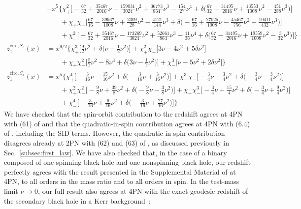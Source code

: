 \documentclass[prd,superscriptaddress,preprintnumbers,tightenlines,nofootinbib, eqsecnum]{revtex4-2}
\newcommand{\nn}{\nonumber}
\begin{document}
\begin{subequations}
\begin{align}
& + x^{5}\Bigg\{\chi_{+}^2\Bigg[-\frac{67}{32} + \frac{35467}{2016} \nu - \frac{159031}{3024} \nu^{2} + \frac{36773}{864} \nu^{3} - \frac{154}{27} \nu^{4} + \delta\Bigg(\frac{67}{32} - \frac{31495}{2016} \nu + \frac{13553}{1008} \nu^{2} - \frac{451}{288} \nu^{3}\Bigg)\Bigg] \nn \\
&\qquad  + \chi_{+}\chi_{-}\Bigg[\frac{67}{16} - \frac{39937}{1008} \nu + \frac{2309}{28} \nu^{2} - \frac{4121}{144} \nu^{3} + \delta\Bigg(-\frac{67}{16} + \frac{27025}{1008} \nu - \frac{45467}{756} \nu^{2} + \frac{10411}{432} \nu^{3}\Bigg)\Bigg] \nn \\
&\qquad + \chi_{-}^2\Bigg[-\frac{67}{32} + \frac{35467}{2016} \nu - \frac{173269}{3024} \nu^{2} + \frac{52661}{864} \nu^{3} - \frac{11}{36} \nu^{4} + \delta\Bigg(\frac{67}{32} - \frac{31495}{2016} \nu + \frac{19559}{1008} \nu^{2} - \frac{3}{32} \nu^{3}\Bigg)\Bigg]\Bigg\} \\
z_1^{\text{circ},S_3}(x) &= x^{9/2}\Bigg\{\chi_{+}^3\Bigg[\frac{9}{2} \nu^{2} + \delta\Bigg(\nu - \frac{1}{2} \nu^{2}\Bigg)\Bigg] + \chi_{+}^2\chi_{-}\Bigg[3 \nu - 4 \nu^{2} + 5 \delta \nu^{2}\Bigg] \nn \\
&\qquad + \chi_{+}\chi_{-}^2\Bigg[\frac{5}{2} \nu^{2} - 8 \nu^{3} + \delta\Bigg(3 \nu - \frac{1}{2} \nu^{2}\Bigg)\Bigg] + \chi_{-}^3\Bigg[\nu - 5 \nu^{2} + 2 \delta \nu^{2}\Bigg]\Bigg\} \\
z_1^{\text{circ},S_4}(x) &= x^{5}\Bigg\{\chi_{+}^4\Bigg[-\frac{3}{16} \nu - \frac{15}{16} \nu^{2} + \delta\Bigg(-\frac{3}{16} \nu + \frac{3}{16} \nu^{2}\Bigg)\Bigg] + \chi_{+}^3\chi_{-}\Bigg[-\frac{3}{4} \nu + \frac{3}{4} \nu^{2} + \delta\Bigg(-\frac{3}{4} \nu - \frac{3}{4} \nu^{2}\Bigg)\Bigg] \nn \\
&\qquad + \chi_{+}^2\chi_{-}^2\Bigg[-\frac{9}{8} \nu + \frac{39}{8} \nu^{2} + \delta\Bigg(-\frac{9}{8} \nu - \frac{3}{8} \nu^{2}\Bigg)\Bigg] + \chi_{+}\chi_{-}^3\Bigg[-\frac{3}{4} \nu + \frac{15}{4} \nu^{2} + \delta\Bigg(-\frac{3}{4} \nu + \frac{9}{4} \nu^{2}\Bigg)\Bigg] \nn \\
& \qquad  + \chi_{-}^4\Bigg[-\frac{3}{16} \nu + \frac{9}{16} \nu^{2} + \delta\Bigg(-\frac{3}{16} \nu + \frac{27}{16} \nu^{2}\Bigg)\Bigg]\Bigg\}
\end{align}
\end{subequations}
%
%
We have checked that 
the spin-orbit contribution to the redshift agrees at 4PN with  (61) of \cite{Bini:2019lcd} and that the quadratic-in-spin contribution agrees at 4PN  with (6.4) of \cite{Bini:2020zqy}, including the SID terms. However, the quadratic-in-spin contribution disagrees already at 2PN with (62) and (63) of \cite{Bini:2019lcd}, as discussed previously in Sec.~\ref{subsec:first_law}. We have also checked that, in the case of a binary composed of one spinning black hole and one nonspinning black hole, our redshift perfectly agrees with the result presented in the Supplemental Material of \cite{Bautista:2024agp} at 4PN, to all orders in the mass ratio and to all orders in spin. In the test-mass limit $\nu\rightarrow 0$, our full result also agrees at 4PN with the exact geodesic redshift of the secondary black hole in a Kerr background~\cite{Siemonsen:2019dsu}:
\end{document}
